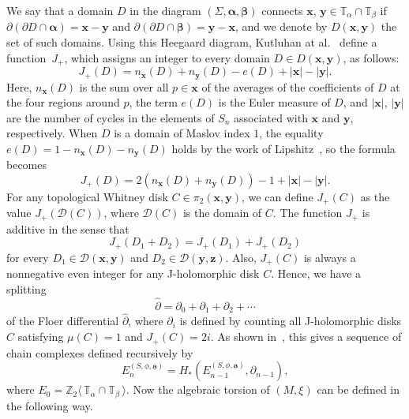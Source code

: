 \documentclass[11pt,oneside,english]{amsart}
\numberwithin{equation}{section}
\numberwithin{figure}{section}
\theoremstyle{definition}
\theoremstyle{plain}
\theoremstyle{plain}
\theoremstyle{remark}
\theoremstyle{plain}
\begin{document}
We say that a domain $D$ in the diagram $({\Sigma},{\boldsymbol{\alpha}},{\boldsymbol{\beta}})$ connects $\mathbf{x}$, $\mathbf{y} \in {\mathbb{T}}_{\alpha} \cap {\mathbb{T}}_{\beta}$
if $\partial(\partial D\cap{\boldsymbol{\alpha}})=\mathbf{x}-\mathbf{y}$
and $\partial(\partial D \cap {\boldsymbol{\beta}}) = {\mathbf{y}} - {\mathbf{x}}$, and we denote by $D({\mathbf{x}},{\mathbf{y}})$ the set of such domains.
Using this Heegaard diagram, Kutluhan at al.~\cite{key-10} define a function~$J_+$,
which assigns an integer to every domain $D \in D({\mathbf{x}},{\mathbf{y}})$, as follows:
\[
J_{+}(D)=n_{\mathbf{x}}(D)+n_{\mathbf{y}}(D)-e(D)+|\mathbf{x}|-|\mathbf{y}|.
\]
Here, $n_{\mathbf{x}}(D)$ is the sum over all $p\in\mathbf{x}$ of the averages of the coefficients
of $D$ at the four regions around $p$, the term
$e(D)$ is the Euler measure of $D$, and $|{\mathbf{x}}|$, $|{\mathbf{y}}|$ are the number
of cycles in the elements of $S_n$ associated with ${\mathbf{x}}$ and ${\mathbf{y}}$, respectively.
When $D$ is a domain of Maslov index $1$, the equality
$e(D)=1-n_{\mathbf{x}}(D)-n_{\mathbf{y}}(D)$ holds by the work of Lipshitz~\cite{key-6},
so the formula becomes
\[
J_{+}(D)=2(n_{\mathbf{x}}(D)+n_{\mathbf{y}}(D))-1+|\mathbf{x}|-|\mathbf{y}|.
\]
 For any topological Whitney disk $C \in \pi_2({\mathbf{x}},{\mathbf{y}})$, we can define $J_{+}(C)$
as the value $J_{+}({\mathcal{D}}(C))$, where ${\mathcal{D}}(C)$ is the domain of $C$.
The function $J_{+}$ is additive in the sense that
\[
J_{+}(D_{1} + D_{2}) = J_{+}(D_{1})+J_{+}(D_{2})
\]
for every $D_1 \in {\mathcal{D}}({\mathbf{x}},{\mathbf{y}})$ and $D_2 \in {\mathcal{D}}({\mathbf{y}},{\mathbf{z}})$.
Also, $J_{+}(C)$ is always a nonnegative even integer for any J-holomorphic
disk $C$.
Hence, we have a splitting
\[
\widehat{\partial}=\partial_{0}+\partial_{1}+\partial_{2}+\cdots
\]
of the Floer differential $\widehat{\partial}$, where $\partial_{i}$ is defined by counting all J-holomorphic disks
$C$ satisfying $\mu(C)=1$ and $J_{+}(C)=2i$. As shown in~\cite{key-10}, this gives a sequence of chain complexes
defined recursively by
\[
E_{n}^{(S,\phi,\underline{\mathbf{a}})}=H_{\ast}\left(E_{n-1}^{(S,\phi,\underline{\mathbf{a}})},\partial_{n-1}\right),
\]
where $E_0 = {\mathbb{Z}}_2\langle\, {\mathbb{T}}_{\alpha} \cap {\mathbb{T}}_{\beta} \,\rangle$.
Now the algebraic torsion of $(M,\xi)$ can be defined in the following way.
\end{document}

